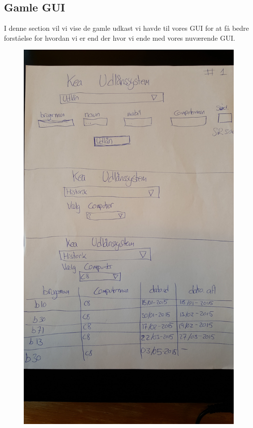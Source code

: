 \documentclass[a4paper]{article}
\begin{document}
\subsection{Gamle GUI}
I denne section vil vi vise de gamle udkast vi havde til vores GUI for at få bedre forståelse for hvordan vi er end der hvor vi ende med vores nuværende GUI.\\[0.2in]
\begin{figure}[h!]
\centering
\includegraphics[width=1\textwidth]{1min.jpg}
\caption{}
\label{fig:GamelGUI1}
\end{figure}
\end{document}
